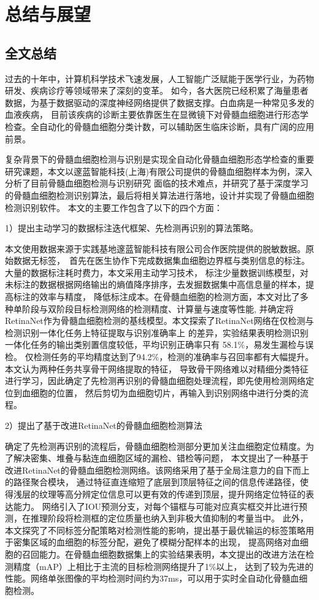 \chapter{总结与展望}
\section{全文总结}
过去的十年中，计算机科学技术飞速发展，人工智能广泛赋能于医学行业，为药物研发、疾病诊疗等领域带来了深刻的变革。
如今，各大医院已经积累了海量患者数据，为基于数据驱动的深度神经网络提供了数据支撑。白血病是一种常见多发的血液疾病，
目前该疾病的诊断主要依靠医生在显微镜下对骨髓血细胞进行形态学检查。全自动化的骨髓血细胞分类计数，可以辅助医生临床诊断，具有广阔的应用前景。

复杂背景下的骨髓血细胞检测与识别是实现全自动化骨髓血细胞形态学检查的重要研究课题，本文以邃蓝智能科技(上海)有限公司提供的骨髓血细胞样本为例，深入分析了目前骨髓血细胞检测与识别研究
面临的技术难点，并研究了基于深度学习的骨髓血细胞检测识别算法，最后将相关算法进行落地，设计并实现了骨髓血细胞检测识别软件。
本文的主要工作包含了以下的四个方面：

1）提出主动学习的数据标注迭代框架、先检测再识别的算法策略。

本文使用数据来源于实践基地邃蓝智能科技有限公司合作医院提供的脱敏数据。原始数据无标签，\
首先在医生协作下完成数据集血细胞边界框与类别信息的标注。大量的数据标注耗时费力，本文采用主动学习技术，
标注少量数据训练模型，对未标注的数据根据网络输出的熵值降序排序，去发掘数据集中高信息量的样本，提高标注的效率与精度，
降低标注成本。在骨髓血细胞的检测方面，本文对比了多种单阶段与双阶段目标检测网络的检测精度、计算量与速度等性能,
并确定将RetinaNet作为骨髓血细胞检测的基线模型。本文探索了RetinaNet网络在仅检测与检测识别一体化任务上特征提取与识别准确率上
的差异，实验结果表明检测识别一体化任务的输出类别置信度较低，平均识别正确率只有 58.1\%，易发生漏检与误检。
仅检测任务的平均精度达到了94.2\%，检测的准确率与召回率都有大幅提升。本文认为两种任务共享骨干网络提取的特征，
导致骨干网络难以对精细分类特征进行学习，因此确定了先检测再识别的骨髓血细胞处理流程，即先使用检测网络定位到血细胞的位置，
然后剪切为血细胞切片，再输入到识别网络中进行分类的流程。

2）提出了基于改进RetinaNet的骨髓血细胞检测算法

确定了先检测再识别的流程后，骨髓血细胞检测部分更加关注血细胞定位精度。为了解决密集、堆叠与黏连血细胞区域的漏检、错检等问题，
本文提出了一种基于改进RetinaNet的骨髓血细胞检测网络。该网络采用了基于全局注意力的自下而上的路径聚合模块，
通过特征直连缩短了底层到顶层特征之间的信息传递路径，使得浅层的纹理等高分辨定位信息可以更有效的传递到顶层，提升网络定位特征的表达能力。
网络引入了IOU预测分支，对每个锚框与可能对应真实框交并比进行预测，在推理阶段将检测框的定位质量也纳入到非极大值抑制的考量当中。
此外，本文探究了不同标签分配策略对检测性能的影响，提出基于最优输运的标签策略用于密集区域的血细胞的标签分配，避免了模糊分配样本的出现，
提高网络对血细胞的召回能力。在骨髓血细胞数据集上的实验结果表明，本文提出的改进方法在检测精度（mAP）上相比于主流的目标检测网络提升了1\%以上，
达到了较为先进的性能。网络单张图像的平均检测时间约为37ms，可以用于实时全自动化骨髓血细胞检测。

